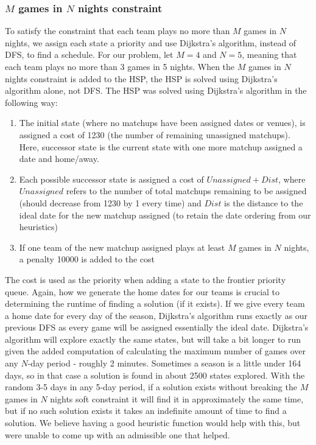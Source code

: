 \documentclass{article}
\begin{document}
	\subsubsection{$M$ games in $N$ nights constraint}
	To satisfy the constraint that each team plays no more than $M$ games in $N$ nights, we assign each state a priority and use Dijkstra's algorithm, instead of DFS, to find a schedule. For our problem, let $M=4$ and $N=5$, meaning that each team plays no more than 3 games in 5 nights.  When the $M$ games in $N$ nights constraint is added to the HSP, the HSP is solved using Dijkstra's algorithm alone, not DFS.
    The HSP was solved using Dijkstra's algorithm in the following way:
    \begin{enumerate}
    	\item The initial state (where no matchups have been assigned dates or venues), is assigned a cost of 1230 (the number of remaining unassigned matchups).  Here,  successor state is the current state with one more matchup assigned a date and home/away.
    	\item Each possible successor state is assigned a cost of $Unassigned + Dist$, where $Unassigned$ refers to the number of total matchups remaining to be assigned (should decrease from 1230 by 1 every time) and $Dist$ is the distance to the ideal date for the new matchup assigned (to retain the date ordering from our heuristics)
    	\item If one team of the new matchup assigned plays at least $M$ games in $N$ nights, a penalty 10000 is added to the cost
    \end{enumerate}
    The cost is used as the priority when adding a state to the frontier priority queue. Again, how we generate the home dates for our teams is crucial to determining the runtime of finding a solution (if it exists). If we give every team a home date for every day of the season, Dijkstra's algorithm runs exactly as our previous DFS as every game will be assigned essentially the ideal date. Dijkstra's algorithm will explore exactly the same states, but will take a bit longer to run given the added computation of calculating the maximum number of games over any $N$-day period - roughly 2 minutes. Sometimes a season is a little under 164 days, so in that case a solution is found in about 2500 states explored. With the random 3-5 days in any 5-day period, if a solution exists without breaking the $M$ games in $N$ nights soft constraint it will find it in approximately the same time, but if no such solution exists it takes an indefinite amount of time to find a solution. We believe having a good heuristic function would help with this, but were unable to come up with an admissible one that helped.
\end{document}
